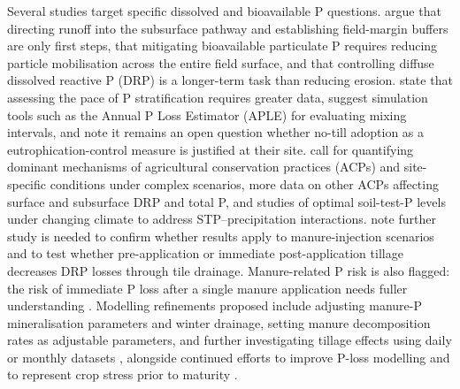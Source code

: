 \documentclass[11pt]{article}
\begin{document}
Several studies target specific dissolved and bioavailable P questions. \textcite{Uusitalo2003} argue that directing runoff into the subsurface pathway and establishing field-margin buffers are only first steps, that mitigating bioavailable particulate P requires reducing particle mobilisation across the entire field surface, and that controlling diffuse dissolved reactive P (DRP) is a longer-term task than reducing erosion. \textcite{Uusitalo2018} state that assessing the pace of P stratification requires greater data, suggest simulation tools such as the Annual P Loss Estimator (APLE) for evaluating mixing intervals, and note it remains an open question whether no-till adoption as a eutrophication-control measure is justified at their site. \textcite{Ni2020} call for quantifying dominant mechanisms of agricultural conservation practices (ACPs) and site-specific conditions under complex scenarios, more data on other ACPs affecting surface and subsurface DRP and total P, and studies of optimal soil-test-P levels under changing climate to address STP--precipitation interactions. \textcite{Wang2018} note further study is needed to confirm whether results apply to manure-injection scenarios and to test whether pre-application or immediate post-application tillage decreases DRP losses through tile drainage. Manure-related P risk is also flagged: the risk of immediate P loss after a single manure application needs fuller understanding \parencite{Madison2014}. Modelling refinements proposed include adjusting manure-P mineralisation parameters and winter drainage, setting manure decomposition rates as adjustable parameters, and further investigating tillage effects using daily or monthly datasets \parencite{Pan2023}, alongside continued efforts to improve P-loss modelling and to represent crop stress prior to maturity \parencite{Wang2019}.
\end{document}
